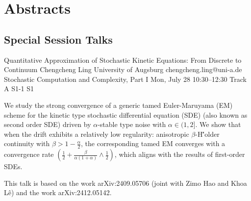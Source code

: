 \chapter{Abstracts}\newpage\section{Special Session Talks}

\begin{talk}
  {Quantitative Approximation of Stochastic Kinetic Equations: From Discrete to Continuum}%
  {Chengcheng Ling}%
  {University of Augsburg}%
  {chengcheng.ling@uni-a.de}%
  {Stochastic Computation and Complexity, Part I}%
  {}%
  {Mon, July 28 10:30–12:30 Track A}%
  {S1-1}%
  {S1}%

We study the strong convergence of a generic tamed Euler-Maruyama (EM) scheme for the kinetic type stochastic differential equation (SDE) (also known as second order SDE) driven by $\alpha$-stable type noise with $\alpha\in(1,2]$. We show that when the drift exhibits a relatively low regularity: anisotropic $\beta$-H\''older continuity with $\beta >1 - \frac{\alpha}{2}$, the corresponding tamed EM converges with a convergence rate $(\frac{1}{2} + \frac{\beta}{\alpha(1+\alpha)} \wedge \frac{1}{2})$, which aligns with the results of  first-order SDEs.


This talk is based on the work arXiv:2409.05706 (joint with Zimo Hao and Khoa L\^e)  and the work arXiv:2412.05142.

\medskip


\end{talk}

